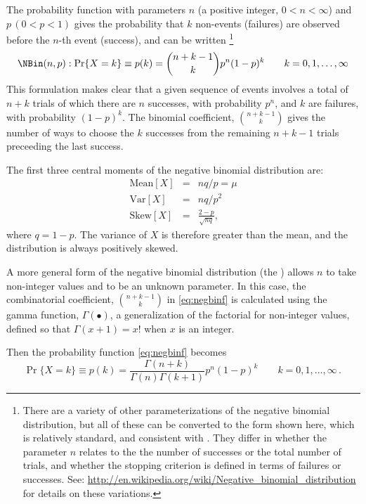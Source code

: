 \documentclass[11pt]{book}\usepackage[]{graphicx}\usepackage[]{color}
\begin{document}
The probability function with parameters $n$ (a positive integer, $0 < n < \infty$) and $p \, (0 < p < 1)$
gives the probability that $k$ non-events (failures) are observed before
the $n$-th event (success), and
can be written%
\footnote{
There are a variety of other parameterizations of the negative binomial distribution,
but all of these can be converted to the form shown here, which is relatively
standard, and consistent with \R. They differ in whether the parameter $n$
relates to the the number of successes or the total number of trials, and
whether the stopping criterion is defined in terms of failures or successes.
See: \url{http://en.wikipedia.org/wiki/Negative_binomial_distribution}
for details on these variations.
}
\begin{equation}\label{eq:negbinf}
\NBin(n,p):   \Pr \{ X = k \} \equiv p(k)  =
  {n+k-1 \choose k} p^n (1-p)^k
  \quad\quad k = 0, 1, \dots , \infty
\end{equation}
This formulation makes clear that a given sequence of events involves 
a total of $n+k$ trials of which there are $n$ successes,
with probability $p^n$, and $k$ are failures, with probability $(1-p)^k$.
The binomial coefficient, ${n+k-1 \choose k}$ gives the number of ways
to choose the $k$ successes from the remaining $n+k-1$ trials preceeding
the last success.

The first three central moments of the negative binomial distribution are:
\begin{eqnarray*}
\textrm{Mean}[X] &=&nq / p  = \mu \\
\textrm{Var}[X] &=&nq / p^2 \\
\textrm{Skew}[X] &=&\frac{2-p}{\sqrt{nq}}
\comma
\end{eqnarray*}
where $q=1-p$. The variance of $X$ is therefore greater than the mean,
and the distribution is always positively skewed.

A more general form of the negative binomial distribution 
(the )
allows $n$ to take non-integer values and to be an unknown
parameter.
In this case, the combinatorial coefficient,
${n+k-1 \choose k}$ in \eqref{eq:negbinf} is calculated using
the gamma function, $\Gamma(\bullet)$,
a generalization of the factorial for non-integer values,
defined so that $\Gamma(x+1) = x!$ when $x$ is an integer.

Then the probability function \eqref{eq:negbinf} becomes
\begin{equation}\label{eq:negbinf2}
  \Pr \{ X = k \} \equiv p(k)  =
  \frac{\Gamma(n+k)}{\Gamma(n) \Gamma(k+1)}
   p^n (1-p)^k
  \quad\quad k = 0, 1, \dots , \infty
  \period
\end{equation}
\end{document}
